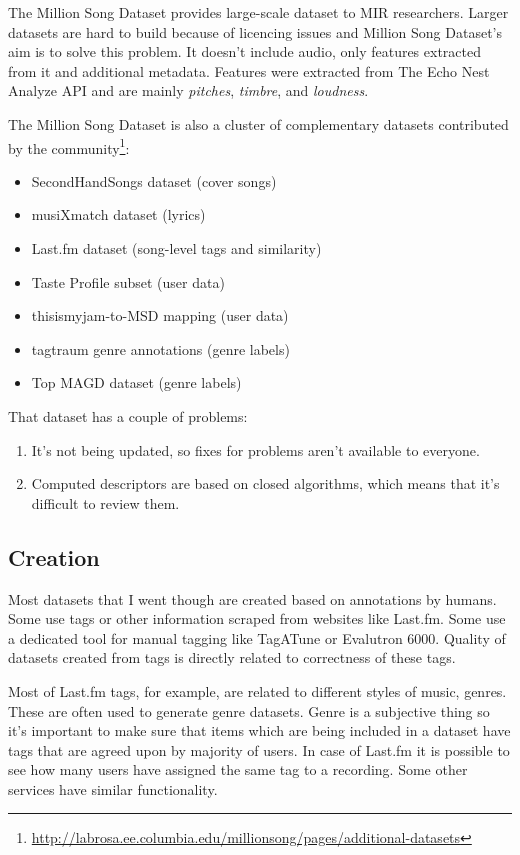 The Million Song Dataset \cite{millionsongdataset} provides large-scale dataset to MIR researchers. Larger datasets are hard to build because of licencing issues and Million Song Dataset's aim is to solve this problem. It doesn't include audio, only features extracted from it and additional metadata. Features were extracted from The Echo Nest Analyze API and are mainly \textit{pitches}, \textit{timbre}, and \textit{loudness}.

The Million Song Dataset is also a cluster of complementary datasets contributed by the community\footnote{\url{http://labrosa.ee.columbia.edu/millionsong/pages/additional-datasets}}:
\begin{itemize}
    \item SecondHandSongs dataset (cover songs)
    \item musiXmatch dataset (lyrics)
    \item Last.fm dataset (song-level tags and similarity)
    \item Taste Profile subset (user data)
    \item thisismyjam-to-MSD mapping (user data)
    \item tagtraum genre annotations (genre labels)
    \item Top MAGD dataset (genre labels)
\end{itemize}

That dataset has a couple of problems:
\begin{enumerate}
    \item It's not being updated, so fixes for problems aren't available to everyone.
    \item Computed descriptors are based on closed algorithms, which means that it's difficult to review them.
\end{enumerate}

\subsection{Creation}

Most datasets that I went though are created based on annotations by humans. Some use tags or other information scraped from websites like Last.fm. Some use a dedicated tool for manual tagging like TagATune or Evalutron 6000. Quality of datasets created from tags is directly related to correctness of these tags.

Most of Last.fm tags, for example, are related to different styles of music, genres. These are often used to generate genre datasets. Genre is a subjective thing so it's important to make sure that items which are being included in a dataset have tags that are agreed upon by majority of users. In case of Last.fm it is possible to see how many users have assigned the same tag to a recording. Some other services have similar functionality.

